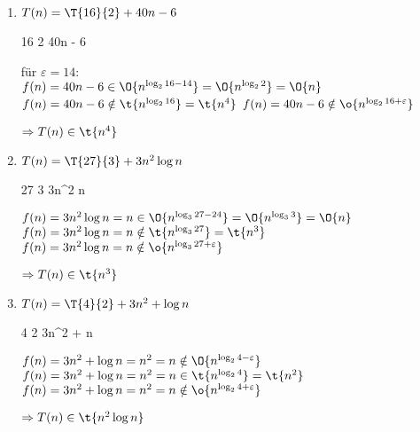 \documentclass{bschlangaul-aufgabe}
\begin{document}
\begin{enumerate}

\item $T(n) = \T{16}{2} + 40n - 6$

\begin{bAntwort}
\bMasterVariablenDeklaration
{16} %
{2} %
{40n - 6} %

\bMasterFallRechnung
{für $\varepsilon = 14$: \\
$f(n) = 40n - 6 \in \O{n^{\log_2 {16 - 14}}} = \O{n^{\log_2 2}} = \O{n}$}
{$f(n) = 40n - 6 \notin \t{n^{\log_2 {16}}} = \t{n^4}$}
{$f(n) = 40n - 6 \notin \o{n^{\log_2 {16 + \varepsilon}}}$}

$\Rightarrow T(n) \in \t{n^4}$

\end{bAntwort}


\item $T(n) = \T{27}{3} + 3n^2 \log n$

\begin{bAntwort}
\bMasterVariablenDeklaration
{27} %
{3} %
{3n^2 \log n} %

\bMasterFallRechnung
{$f(n) = 3n^2 \log n = n \in \O{n^{\log_3 {27 - 24}}} = \O{n^{\log_3 3}} = \O{n}$}
{$f(n) = 3n^2 \log n = n \notin \t{n^{\log_3 {27}}} = \t{n^3}$}
{$f(n) = 3n^2 \log n = n \notin \o{n^{\log_3 {27 + \varepsilon}}}$}

$\Rightarrow T(n) \in \t{n^3}$

\end{bAntwort}


\item $T(n) = \T{4}{2} + 3n^2 + \log n$

\begin{bAntwort}
\bMasterVariablenDeklaration
{4} %
{2} %
{3n^2 + \log n} %

\bMasterFallRechnung
{$f(n) = 3n^2 + \log n = n^2 = n \notin \O{n^{\log_2 {4 - \varepsilon}}}$}
{$f(n) = 3n^2 + \log n = n^2 = n \in \t{n^{\log_2 {4}}} = \t{n^2}$}
{$f(n) = 3n^2 + \log n = n^2 = n \notin \o{n^{\log_2 {4 + \varepsilon}}}$}

$\Rightarrow T(n) \in \t{n^2 \log n}$

\end{bAntwort}


\end{enumerate}
\end{document}
